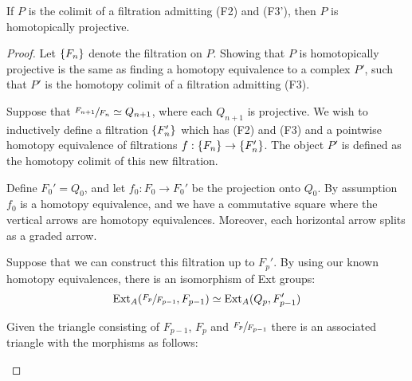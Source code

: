 \documentclass[../thesis.tex]{subfiles}
\begin{document}
            \begin{lemma}\label{lem: homo-proj-homo-well-def}
                If $P$ is the colimit of a filtration admitting (F2) and (F3'), then $P$ is homotopically projective.
            \end{lemma}

            \begin{proof}
                Let $\{F_n\}$ denote the filtration on $P$. Showing that $P$ is homotopically projective is the same as finding a homotopy equivalence to a complex $P'$, such that $P'$ is the homotopy colimit of a filtration admitting (F3).

                Suppose that $\sfrac{F_{n+1}}{F_n}\simeq Q_{n+1}$, where each $Q_{n+1}$ is projective. We wish to inductively define a filtration $\{F_n'\}$ which has (F2) and (F3) and a pointwise homotopy equivalence of filtrations $f : \{F_n\} \rightarrow \{F_n'\}$. The object $P'$ is defined as the homotopy colimit of this new filtration.
                
                Define $F_0' = Q_0$, and let $f_0 : F_0 \rightarrow F_0'$ be the projection onto $Q_0$. By assumption $f_0$ is a homotopy equivalence, and we have a commutative square where the vertical arrows are homotopy equivalences. Moreover, each horizontal arrow splits as a graded arrow.

                \begin{center}
                \end{center}

                Suppose that we can construct this filtration up to $F_p'$. By using our known homotopy equivalences, there is an isomorphism of Ext groups:
                \begin{align*}
                    \text{Ext}_A(\sfrac{F_{p}}{F_{p-1}}, F_{p-1})\simeq \text{Ext}_A(Q_p, F_{p-1}')
                \end{align*}

                Given the triangle consisting of $F_{p-1}$, $F_p$ and $\sfrac{F_p}{F_{p-1}}$ there is an associated triangle with the morphisms as follows:
                \begin{center}
                \end{center}


\end{proof}
\end{document}
